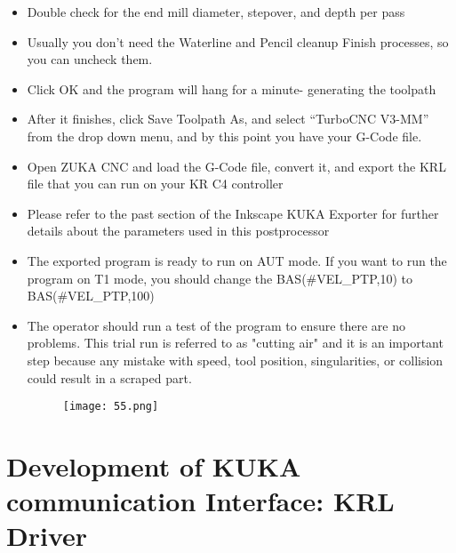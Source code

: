 \begin{itemize}
\item Double check for the end mill diameter, stepover, and depth per pass 

\item Usually you don’t need the Waterline and Pencil cleanup Finish processes, so you can uncheck them.

\item Click OK and the program will hang for a minute- generating the toolpath 

\item After it finishes, click Save Toolpath As, and select “TurboCNC V3-MM” from the drop down menu, and by this point you have your G-Code file.

\item Open ZUKA CNC and load the G-Code file, convert it, and export the KRL file that you can run on your KR C4 controller

\item Please refer to the past section of the Inkscape KUKA Exporter for further details about the parameters used in this postprocessor

\item The exported program is ready to run on AUT mode. If you want to run the program on T1 mode, you should change the  
BAS(\#VEL\_PTP,10) to BAS(\#VEL\_PTP,100)

\item The operator should run a test of the program to ensure there are no problems. This trial run is referred to as "cutting air" and it is an important step because any mistake with speed, tool position, singularities, or collision could result in a scraped part.

\begin{figure}[H]
	\centering
	\texttt{[image: 55.png]}
\end{figure}
	
\end{itemize}
\section{Development of KUKA communication Interface: KRL Driver}

